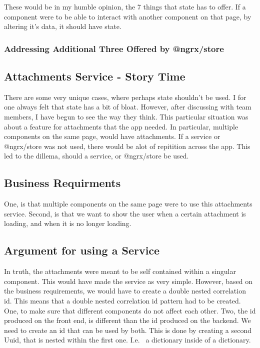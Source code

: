 These would be in my humble opinion, the 7 things that state has to offer. If a
component were to be able to interact with another component on that page, by
altering it's data, it should have state.

\subsubsection{ Addressing Additional Three Offered by @ngrx/store }


\subsection{ Attachments Service - Story Time }
There are some very unique cases, where perhaps state shouldn't be used. I for
one always felt that state has a bit of bloat. However, after discussing with
team members, I have begun to see the way they think. This particular situation
was about a feature for attachments that the app needed. In particular,
multiple components on the same page, would have attachments. If a service or
@ngrx/store was not used, there would be alot of repitition across the app. This
led to the dillema, should a service, or @ngrx/store be used.

\subsection{ Business Requirments }
One, is that multiple components on the same page were to use this attachments
service. Second, is that we want to show the user when a certain attachment is
loading, and when it is no longer loading.

\subsection{ Argument for using a Service }
In truth, the attachments were meant to be self contained within a singular
component. This would have made the service as very simple. However, based on
the business requirements, we would have to create a double nested correlation
id. This means that a double nested correlation id pattern had to be created.
One, to make sure that different components do not affect each other. Two, the
id produced on the front end, is different than the id produced on the backend.
We need to create an id that can be used by both. This is done by creating a
second Uuid, that is nested within the first one. I.e. \ a dictionary inside of a
dictionary.

